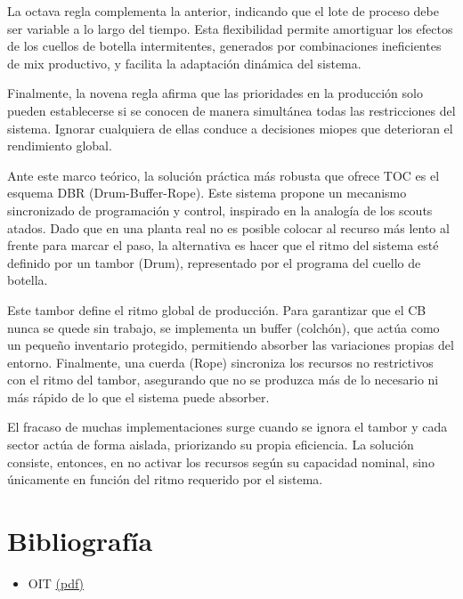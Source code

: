 \documentclass[a4paper,oneside,11pt]{article}
\begin{document}
La octava regla complementa la anterior, indicando que el lote de proceso debe ser variable a lo largo del tiempo. Esta flexibilidad permite amortiguar los efectos de los cuellos de botella intermitentes, generados por combinaciones ineficientes de mix productivo, y facilita la adaptación dinámica del sistema.

Finalmente, la novena regla afirma que las prioridades en la producción solo pueden establecerse si se conocen de manera simultánea todas las restricciones del sistema. Ignorar cualquiera de ellas conduce a decisiones miopes que deterioran el rendimiento global.

Ante este marco teórico, la solución práctica más robusta que ofrece TOC es el esquema DBR (Drum-Buffer-Rope). Este sistema propone un mecanismo sincronizado de programación y control, inspirado en la analogía de los scouts atados. Dado que en una planta real no es posible colocar al recurso más lento al frente para marcar el paso, la alternativa es hacer que el ritmo del sistema esté definido por un tambor (Drum), representado por el programa del cuello de botella.

Este tambor define el ritmo global de producción. Para garantizar que el CB nunca se quede sin trabajo, se implementa un buffer (colchón), que actúa como un pequeño inventario protegido, permitiendo absorber las variaciones propias del entorno. Finalmente, una cuerda (Rope) sincroniza los recursos no restrictivos con el ritmo del tambor, asegurando que no se produzca más de lo necesario ni más rápido de lo que el sistema puede absorber.

El fracaso de muchas implementaciones surge cuando se ignora el tambor y cada sector actúa de forma aislada, priorizando su propia eficiencia. La solución consiste, entonces, en no activar los recursos según su capacidad nominal, sino únicamente en función del ritmo requerido por el sistema.











\clearpage
\section{Bibliografía}
\begin{itemize}
    \item OIT \href{https://teacherke.wordpress.com/wp-content/uploads/2010/09/introduccion-al-estudio-del-trabajo-oit.pdf}{(pdf) }
\end{itemize}
\end{document}
